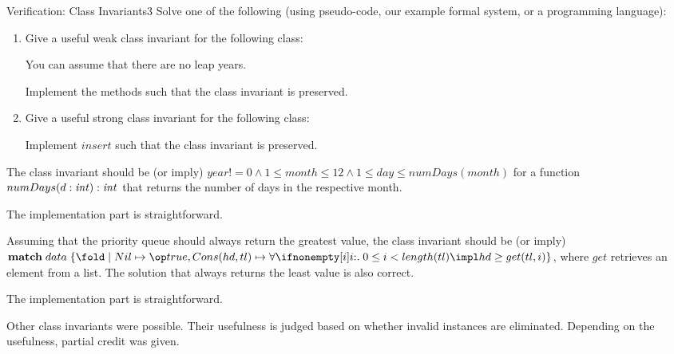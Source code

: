 \documentclass[a4paper]{article}
\begin{document}
\begin{problem}{Verification: Class Invariants}{3}
Solve one of the following (using pseudo-code, our example formal system, or a programming language):

\begin{enumerate}
\item Give a useful weak class invariant for the following class:

\begin{acode}
\end{acode}
You can assume that there are no leap years.

Implement the methods such that the class invariant is preserved.

\item Give a useful strong class invariant for the following class:
\begin{acode}
\end{acode}

Implement $insert$ such that the class invariant is preserved.
\end{enumerate}

\begin{solution}
\begin{compactenum}
 \item The class invariant should be (or imply) $year!=0 \wedge 1\leq month\leq 12 \wedge 1\leq day\leq numDays(month)$ for a function $numDays(d:\mathit{int}):\mathit{int}$ that returns the number of days in the respective month.
 
 The implementation part is straightforward.
 \item Assuming that the priority queue should always return the greatest value, the class invariant should be (or imply) $\amatchI{data}{\acase{Nil}{\true},\acase{Cons(hd,tl)}{\afa{i}{0\leq i< length(tl)\impl hd\geq get(tl,i)}}}$, where $get$ retrieves an element from a list.
 The solution that always returns the least value is also correct.

 The implementation part is straightforward.
\end{compactenum}
Other class invariants were possible. Their usefulness is judged based on whether invalid instances are eliminated. Depending on the usefulness, partial credit was given.
\end{solution}
\end{problem}
\end{document}
